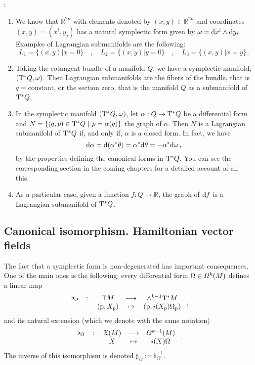 \documentclass[12pt]{report}
\def\vf{\mathfrak X}
\def\df{{\mit\Omega}}
\def\d{{\rm d}}
\def\Real{\mathbb{R}}
\def\Tan{{\rm T}}
\def\inn{\mathop{i}\nolimits}
\begin{document}
\bigskip
{}:
\begin{enumerate}
\item We know that $\Real^{2n}$ with elements denoted by $(x,y)\in\Real^{2n}$ and coordinates $(x,y)=(x^{i} ,y_{j})$ has a natural symplectic form given by $\omega= \d x^{i}\wedge\d y_{i}$. Examples of Lagrangian submanifolds are the following:
$$
L_{1}=\{(x,y)|x=0\} \quad , \quad
L_{2}=\{(x,y)|y=0\} \quad , \quad
L_{3}=\{(x,y)|x=y\} \ .
$$
\item Taking the cotangent bundle of a manifold $Q$, we have a symplectic manifold, $(\Tan^*Q,\omega)$. Then Lagrangian submanifolds are the fibers of the bundle, that is $q=\mathrm{constant}$, or the section zero, that is the manifold $Q$ as a submanifold of $\Tan^*Q$.
\item In the symplectic manifold $(\Tan^*Q,\omega)$, let $\alpha:Q\to\Tan^*Q$ be a differential form and $N=\{(q,p)\in\Tan^*Q\ | \ p=\alpha(q)\}$ the graph of $\alpha$. Then $N$ is a Lagrangian submanifold of $\Tan^*Q$ if, and only if, $\alpha$ is a closed form. In fact, we have
$$
\d\alpha=\d(\alpha^{*}\theta)=\alpha^{*}\d\theta=-\alpha^{*}\d\omega\, ,
$$
by the properties defining the canonical forms in $\Tan^*Q$. You can see the corresponding section in the coming chapters for a detailed account of all this.
\item As a particular case, given a function $f:Q\to\Real$, the graph of $\d f$ is a Lagrangian submanifold of $\Tan^*Q$.
\end{enumerate}



\subsection{Canonical isomorphism. Hamiltonian vector fields}
\protect\label{icch}


The fact that a symplectic form is non-degenerated
has important consequences. One of the main ones is the following:
every differential form $\Omega\in\df^k(M)$
defines a linear map
$$
\begin{array}{ccccc}
\flat_\Omega & \colon & \Tan M & \longrightarrow &\wedge^{k-1} \Tan^*M
\\
 & & ({\rm p},X_{\rm p}) & \mapsto & ({\rm p},\inn(X_{\rm p})\Omega_{\rm p})
\end{array} \ ,
$$
and its natural extension (which we denote with the same notation)
$$
\begin{array}{ccccc}
\flat_\Omega & \colon & \vf (M) & \longrightarrow & {\mit\Omega}^{k-1}(M)
\\
 & & X & \mapsto & \inn(X)\Omega
\end{array} \ .
$$
The inverse of this isomorphism is denoted $\sharp_\Omega:=\flat_\Omega^{-1}$.
\end{document}
